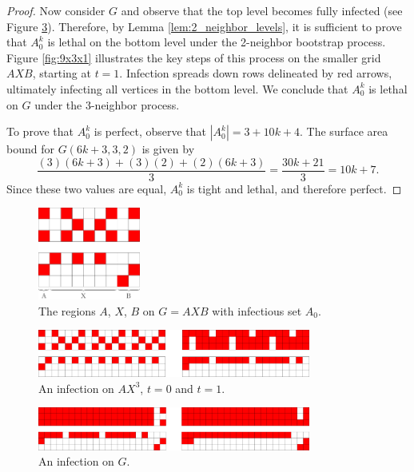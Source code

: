\begin{proof}
Now consider $G$ and observe that the top level becomes fully infected (see Figure \ref{fig:21x3x2}). Therefore, by Lemma \ref{lem:2_neighbor_levels}, it is sufficient to prove that $A_0^k$ is lethal on the bottom level under the 2-neighbor bootstrap process. Figure \ref{fig:9x3x1} illustrates the key steps of this process on the smaller grid $AXB$, starting at $t=1$. Infection spreads down rows delineated by red arrows, ultimately infecting all vertices in the bottom level. We conclude that $A_0^k$ is lethal on $G$ under the 3-neighbor process.

To prove that $A_0^k$ is perfect, observe that $|A_0^k| = 3 + 10k + 4$. The surface area bound for $G(6k+3,3,2)$ is given by
$$\frac{(3)(6k+3) + (3)(2) + (2)(6k+3)}{3} = \frac{30k + 21}{3} = 10k+7.$$
Since these two values are equal, $A_0^k$ is tight and lethal, and therefore perfect.
\end{proof}

\begin{figure}[]
\centering
\includegraphics[width=0.3\textwidth]{figures/7/3x9x2.pdf}
\caption{The regions $A$, $X$, $B$ on $G=AXB$ with infectious set $A_0$.}
\label{fig:9x3x2}
\end{figure} 

\begin{figure}[]
\centering
\includegraphics[width=0.8\textwidth]{figures/7/3x19x2.pdf}
\caption{An infection on $AX^3$, $t=0$ and $t=1$.}
\label{fig:19x3x2}
\end{figure} 

\begin{figure}[]
\centering
\includegraphics[width=0.8\textwidth]{figures/7/3x21x2.pdf}
\caption{An infection on $G$.}
\label{fig:21x3x2}
\end{figure} 

